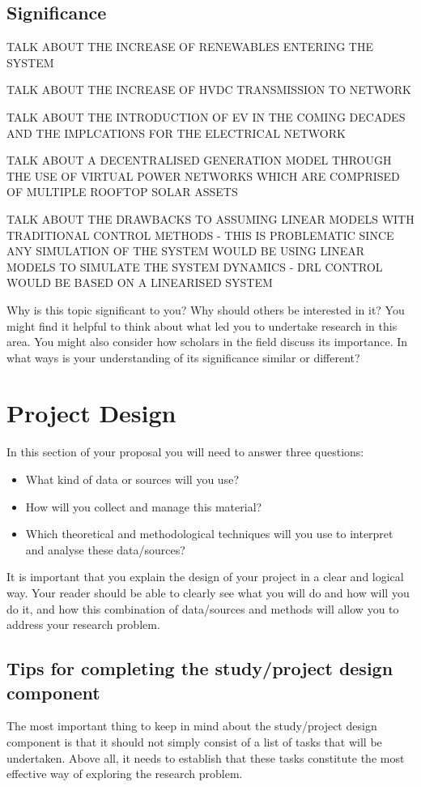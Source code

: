 \documentclass[12pt, a4paper]{article}
\begin{document}
\subsection{Significance}

TALK ABOUT THE INCREASE OF RENEWABLES ENTERING THE SYSTEM

TALK ABOUT THE INCREASE OF HVDC TRANSMISSION TO NETWORK

TALK ABOUT THE INTRODUCTION OF EV IN THE COMING DECADES AND THE IMPLCATIONS FOR THE ELECTRICAL NETWORK

TALK ABOUT A DECENTRALISED GENERATION MODEL THROUGH THE USE OF VIRTUAL POWER NETWORKS WHICH ARE COMPRISED OF MULTIPLE ROOFTOP SOLAR ASSETS

TALK ABOUT THE DRAWBACKS TO ASSUMING LINEAR MODELS WITH TRADITIONAL CONTROL METHODS - THIS IS PROBLEMATIC SINCE ANY SIMULATION OF THE SYSTEM WOULD BE USING LINEAR MODELS TO SIMULATE THE SYSTEM DYNAMICS - DRL CONTROL WOULD BE BASED ON A LINEARISED SYSTEM

Why is this topic significant to you? Why should others be interested in it? You might find it helpful to think about what led you to undertake research in this area. You might also consider how scholars in the field discuss its importance. In what ways is your understanding of its significance similar or different?

\section{Project Design}
In this section of your proposal you will need to answer three questions:
\begin{itemize}
\item What kind of data or sources will you use?
\item How will you collect and manage this material?
\item Which theoretical and methodological techniques will you use to interpret and analyse these data/sources?
\end{itemize}

It is important that you explain the design of your project in a clear and logical way. Your reader should be able to clearly see what you will do and how will you do it, and how this combination of data/sources and methods will allow you to address your research problem.

\subsection{Tips for completing the study/project design component}
The most important thing to keep in mind about the study/project design component is that it should not simply consist of a list of tasks that will be undertaken. Above all, it needs to establish that these tasks constitute the most effective way of exploring the research problem.
\end{document}
